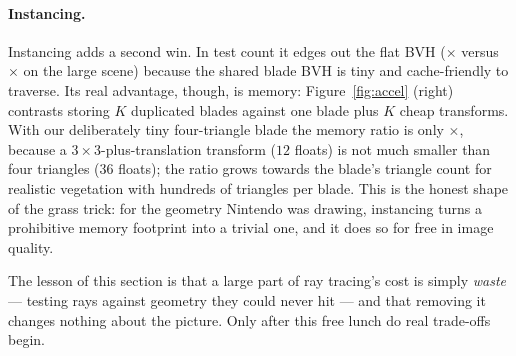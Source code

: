 \paragraph{Instancing.} Instancing adds a second win. In test count it edges out
the flat BVH (\AccelSpeedupInst$\times$ versus \AccelSpeedup$\times$ on the large
scene) because the shared blade BVH is tiny and cache-friendly to traverse. Its
real advantage, though, is memory: Figure~\ref{fig:accel} (right) contrasts
storing $K$ duplicated blades against one blade plus $K$ cheap transforms. With
our deliberately tiny four-triangle blade the memory ratio is only
\MemRatio$\times$, because a $3\times3$-plus-translation transform ($12$ floats)
is not much smaller than four triangles ($36$ floats); the ratio grows towards
the blade's triangle count for realistic vegetation with hundreds of triangles
per blade. This is the honest shape of the grass trick: for the geometry Nintendo
was drawing, instancing turns a prohibitive memory footprint into a trivial one,
and it does so for free in image quality.

The lesson of this section is that a large part of ray tracing's cost is simply
\emph{waste} --- testing rays against geometry they could never hit --- and that
removing it changes nothing about the picture. Only after this free lunch do real
trade-offs begin.
